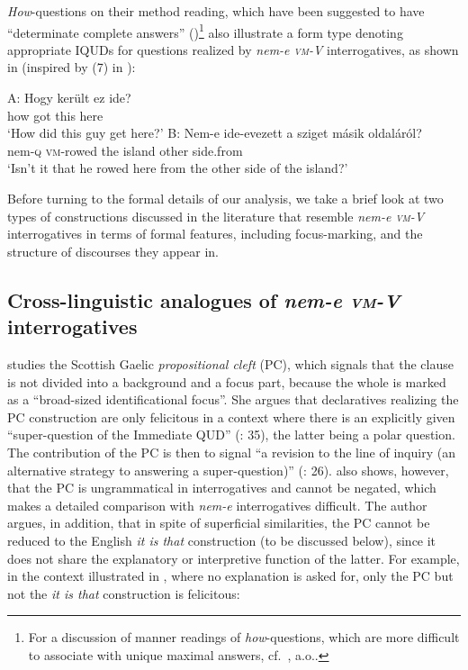 \documentclass[output=paper,colorlinks,citecolor=brown]{langscibook}
\begin{document}
	
	
	
	\textit{How}-questions on their method reading, which  have  been suggested to have ``determinate complete answers'' (\citealt[3175]{saeboe2016})\footnote{For a discussion of manner readings of \textit{how}-questions, which are more difficult to associate with unique maximal answers, cf.~\citet{oshima2007, abrusan2011, saeboe2016, schwarz+simonenko}, a.o..} also illustrate a form type denoting appropriate IQUDs for questions realized by \textit{nem-e \textsc{vm}-V} interrogatives, as shown in  (inspired by (7) in \citealt{saeboe2016}):  
	
	\ea\label{ex:rowed}
	\ea \gll A: Hogy került ez ide?\\
	{} how got this here\\
	\glt \hspace{0.4cm}`How did this guy get here?'
	\ex \gll B: Nem-e ide-evezett a sziget másik oldaláról?\\
	{} nem-\textsc{q} \textsc{vm}-rowed the island other side.from\\
	\glt \hspace{0.4cm}`Isn't it that he rowed here from the other side of the island?'
	\z
	\z
	
	
	Before turning to the formal details of our analysis, we take a brief look at two 
	types of constructions discussed in the literature that resemble \textit{nem-e \textsc{vm}-V} interrogatives in terms of formal features, including focus-marking, and the structure of discourses they appear in. 
	
	
\subsection{Cross-linguistic analogues of \textit{nem-e \textsc{vm}-V} interrogatives}
	
	\citet{sheil16} studies  the  Scottish Gaelic \textit{propositional cleft} (PC), which signals that the clause is not divided into a background and a focus part, because the whole is marked as a ``broad-sized identificational focus''. She argues that declaratives realizing the  PC construction are only felicitous in a context where there is an explicitly given ``super-question of the Immediate QUD'' (\citealt{sheil16}: 35),  the latter being a polar question. The contribution of the PC is then to signal ``a revision to the line of inquiry (an alternative strategy to answering a super-question)'' (\citeyear{sheil16}: 26). 
	\citet[4]{sheil16} also shows, however, that the PC is ungrammatical in interrogatives   and cannot be negated, which makes a detailed comparison with \textit{nem-e} interrogatives difficult. The author argues, in addition, that in spite of superficial similarities, the PC cannot be reduced to the English \textit{it is that} construction (to be discussed below), since it does not share the explanatory or interpretive function of the latter. For example, in the context illustrated in , where no explanation is asked for, only the PC but not the \textit{it is that} construction is felicitous:
	
\end{document}
